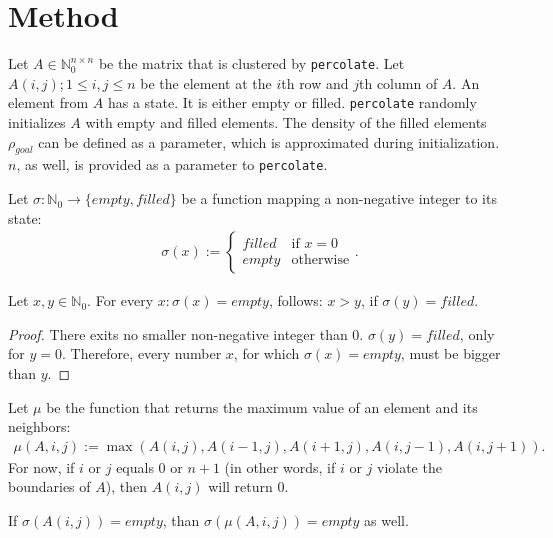 \documentclass[twoside,11pt]{article}
\def\perc{\texttt{perco\-late}}
\begin{document}

\section{Method} %

Let $A \in \mathbb{N}_0^{n \times n}$ be the matrix that
is clustered by \perc{}.
Let $A(i, j);1\leq i, j \leq n$ be the element at the
$i$th row and $j$th column of $A$.
An element from $A$ has a state. It is either empty or
filled.
\perc{} randomly initializes $A$ with empty and filled
elements.
The density of the filled elements $\rho_{goal}$ can be
defined as a parameter, which is approximated during
initialization. $n$, as well, is provided as a parameter to
\perc{}.

Let $\sigma : \mathbb{N}_0 \rightarrow \{empty,filled\}$ be
a function mapping a non-negative integer to its state:
\begin{align*}
  \sigma(x) := \begin{cases}
    filled &\text{if } x = 0 \\
    empty  &\text{otherwise}
  \end{cases}.
\end{align*}

\begin{proposition}
  \label{prop:one}
  Let $x, y \in \mathbb{N}_0$.
  For every $x: \sigma(x) = empty$, follows: $x > y$, if
  $\sigma(y) = filled$.
\end{proposition}

\begin{proof}
  There exits no smaller non-negative integer than $0$.
  $\sigma(y) = filled$, only for $y = 0$. Therefore, every
  number $x$, for which $\sigma(x) = empty$, must be bigger
  than $y$.
\end{proof}

Let $\mu$ be the function that returns the maximum value
of an element and its neighbors:
\begin{align*}
  \mu(A, i, j) := \max(A(i,j), A(i-1,j), A(i+1,j),
                       A(i,j-1), A(i,j+1)).
\end{align*}
For now, if $i$ or $j$ equals $0$ or $n + 1$ (in other
words, if $i$ or $j$ violate the boundaries of $A$), then
$A(i, j)$ will return $0$.

\begin{proposition}
  \label{prop:two}
  If $\sigma(A(i, j)) = empty$, than
  $\sigma(\mu(A, i, j)) = empty$ as well.
\end{proposition}
\end{document}
